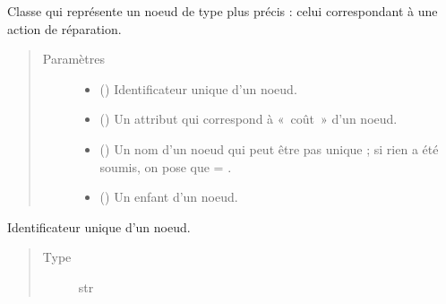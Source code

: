 \documentclass[letterpaper,10pt,french]{sphinxmanual}
\begin{document}

\begin{fulllineitems}
\label{\detokenize{index:StrategyTree.Repair}}
Classe qui représente un noeud de type plus précis : celui correspondant à une action de réparation.
\begin{quote}\begin{description}
\item[{Paramètres}] \leavevmode\begin{itemize}
\item {} 
 () \textendash{} Identificateur unique d’un noeud.

\item {} 
 () \textendash{} Un attribut qui correspond à « coût » d’un noeud.

\item {} 
 (\sphinxstyleliteralemphasis{\sphinxupquote{, }}) \textendash{} Un nom d’un noeud qui peut être pas unique ; si rien a été soumis, on pose que  = .

\item {} 
 ({\hyperref[\detokenize{index:StrategyTree.NodeST}]{}}\sphinxstyleliteralemphasis{\sphinxupquote{, }}) \textendash{} Un enfant d’un noeud.

\end{itemize}

\end{description}\end{quote}

\begin{fulllineitems}
\label{\detokenize{index:StrategyTree.Repair._id}}
Identificateur unique d’un noeud.
\begin{quote}\begin{description}
\item[{Type}] \leavevmode
str


\end{description}
\end{quote}
\end{fulllineitems}
\end{fulllineitems}
\end{document}
